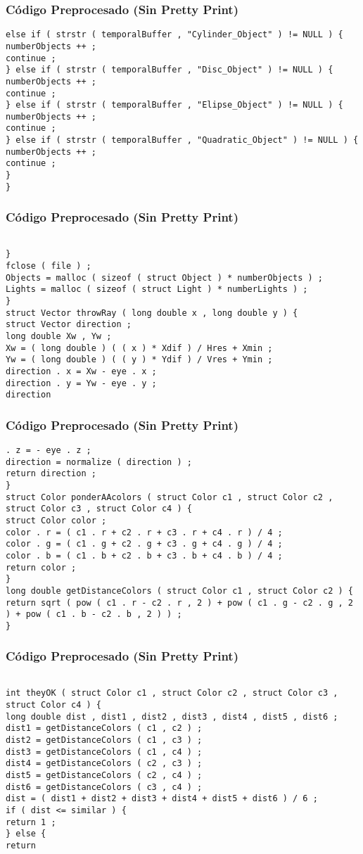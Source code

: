 \documentclass{beamer}
\begin{document}
\begin{frame}[fragile]
\frametitle{C\'odigo Preprocesado (Sin Pretty Print)}
\begin{lstlisting}[style=CStyle]
else if ( strstr ( temporalBuffer , "Cylinder_Object" ) != NULL ) { 
numberObjects ++ ; 
continue ; 
} else if ( strstr ( temporalBuffer , "Disc_Object" ) != NULL ) { 
numberObjects ++ ; 
continue ; 
} else if ( strstr ( temporalBuffer , "Elipse_Object" ) != NULL ) { 
numberObjects ++ ; 
continue ; 
} else if ( strstr ( temporalBuffer , "Quadratic_Object" ) != NULL ) { 
numberObjects ++ ; 
continue ; 
} 
} \end{lstlisting}
\end{frame}
\begin{frame}[fragile]
\frametitle{C\'odigo Preprocesado (Sin Pretty Print)}
\begin{lstlisting}[style=CStyle]

} 
fclose ( file ) ; 
Objects = malloc ( sizeof ( struct Object ) * numberObjects ) ; 
Lights = malloc ( sizeof ( struct Light ) * numberLights ) ; 
} 
struct Vector throwRay ( long double x , long double y ) { 
struct Vector direction ; 
long double Xw , Yw ; 
Xw = ( long double ) ( ( x ) * Xdif ) / Hres + Xmin ; 
Yw = ( long double ) ( ( y ) * Ydif ) / Vres + Ymin ; 
direction . x = Xw - eye . x ; 
direction . y = Yw - eye . y ; 
direction \end{lstlisting}
\end{frame}
\begin{frame}[fragile]
\frametitle{C\'odigo Preprocesado (Sin Pretty Print)}
\begin{lstlisting}[style=CStyle]
. z = - eye . z ; 
direction = normalize ( direction ) ; 
return direction ; 
} 
struct Color ponderAAcolors ( struct Color c1 , struct Color c2 , struct Color c3 , struct Color c4 ) { 
struct Color color ; 
color . r = ( c1 . r + c2 . r + c3 . r + c4 . r ) / 4 ; 
color . g = ( c1 . g + c2 . g + c3 . g + c4 . g ) / 4 ; 
color . b = ( c1 . b + c2 . b + c3 . b + c4 . b ) / 4 ; 
return color ; 
} 
long double getDistanceColors ( struct Color c1 , struct Color c2 ) { 
return sqrt ( pow ( c1 . r - c2 . r , 2 ) + pow ( c1 . g - c2 . g , 2 ) + pow ( c1 . b - c2 . b , 2 ) ) ; 
} \end{lstlisting}
\end{frame}
\begin{frame}[fragile]
\frametitle{C\'odigo Preprocesado (Sin Pretty Print)}
\begin{lstlisting}[style=CStyle]

int theyOK ( struct Color c1 , struct Color c2 , struct Color c3 , struct Color c4 ) { 
long double dist , dist1 , dist2 , dist3 , dist4 , dist5 , dist6 ; 
dist1 = getDistanceColors ( c1 , c2 ) ; 
dist2 = getDistanceColors ( c1 , c3 ) ; 
dist3 = getDistanceColors ( c1 , c4 ) ; 
dist4 = getDistanceColors ( c2 , c3 ) ; 
dist5 = getDistanceColors ( c2 , c4 ) ; 
dist6 = getDistanceColors ( c3 , c4 ) ; 
dist = ( dist1 + dist2 + dist3 + dist4 + dist5 + dist6 ) / 6 ; 
if ( dist <= similar ) { 
return 1 ; 
} else { 
return \end{lstlisting}
\end{frame}
\end{document}
